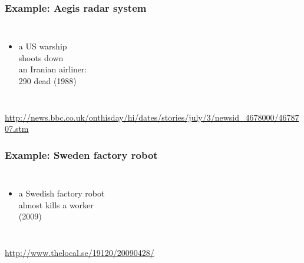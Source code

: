 \documentclass[dvipsnames]{beamer}
\theoremstyle{plain}
\begin{document}
\begin{frame}
  \frametitle{Example: Aegis radar system}

  \begin{columns}

    \begin{itemize}
      \item a US warship\\
        shoots down\\
        an Iranian airliner:\\
        290 dead (1988)
    \end{itemize}
  \end{columns}

  \medskip
  \tiny{\url{http://news.bbc.co.uk/onthisday/hi/dates/stories/july/3/newsid_4678000/4678707.stm}}\\
\end{frame}

\begin{frame}
  \frametitle{Example: Sweden factory robot}

  \begin{columns}

    \begin{itemize}
      \item a Swedish factory robot\\
        almost kills a worker\\
        (2009)
    \end{itemize}
  \end{columns}

  \medskip
  \tiny{\url{http://www.thelocal.se/19120/20090428/}}\\
\end{frame}
\end{document}
